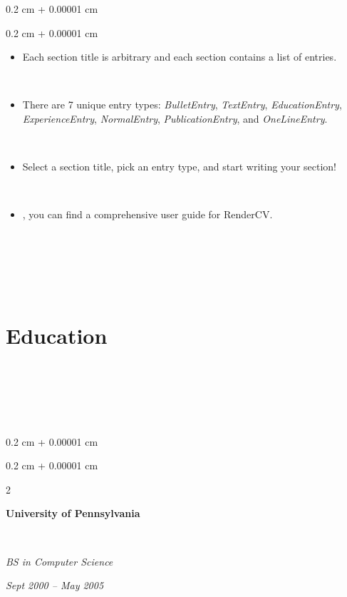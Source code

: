 \documentclass[10pt, letterpaper]{article}
\newenvironment{highlightsforbulletentries}{

    \begin{itemize}[

        topsep=0.10 cm,

        parsep=0.10 cm,

        partopsep=0pt,

        itemsep=0pt,

        leftmargin=10pt

    ]

}{

    \end{itemize}

} %
\newenvironment{onecolentry}{

    \begin{adjustwidth}{

        0.2 cm + 0.00001 cm

    }{

        0.2 cm + 0.00001 cm

    }

}{

    \end{adjustwidth}

} %
\newenvironment{twocolentry}[2][]{

    \onecolentry

    \def\secondColumn{#2}

    \setcolumnwidth{\fill, 4.5 cm}

    \begin{paracol}{2}

}{

    \switchcolumn \raggedleft \secondColumn

    \end{paracol}

    \endonecolentry

} %
\let\hrefWithoutArrow\href
\renewcommand{\href}[2]{\hrefWithoutArrow{#1}{\ifthenelse{\equal{#2}{}}{ }{#2 }\raisebox{.15ex}{\footnotesize \faExternalLink*}}}
\begin{document}
    \begin{onecolentry}

        \begin{highlightsforbulletentries}

​

​

        \item Each section title is arbitrary and each section contains a list of entries.

​

        \item There are 7 unique entry types: \textit{BulletEntry}, \textit{TextEntry}, \textit{EducationEntry}, \textit{ExperienceEntry}, \textit{NormalEntry}, \textit{PublicationEntry}, and \textit{OneLineEntry}.

​

        \item Select a section title, pick an entry type, and start writing your section!

​

        \item \href{https://docs.rendercv.com/user_guide/}{Here}, you can find a comprehensive user guide for RenderCV.

​

​

        \end{highlightsforbulletentries}

    \end{onecolentry}

​

    \section{Education}

​

​

​

        

        \begin{twocolentry}{

            

            

        \textit{Sept 2000 – May 2005}}

            \textbf{University of Pennsylvania}

​

            \textit{BS in Computer Science}

        \end{twocolentry}
\end{document}
